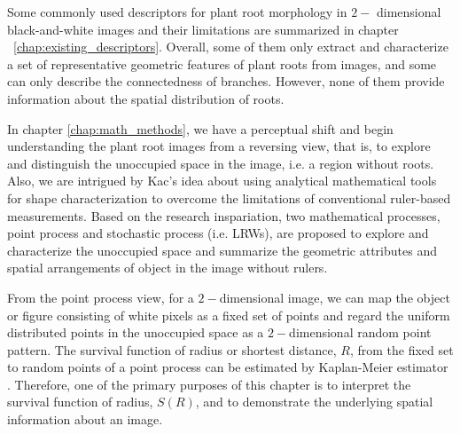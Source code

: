 


Some commonly used descriptors for plant root morphology in $2-$
dimensional black-and-white images and their limitations are
summarized in chapter ~\ref{chap:existing_descriptors}. Overall, some
of them only extract and characterize a set of representative
geometric features of plant roots from images, and some can only
describe the connectedness of branches. However, none of them provide
information about the spatial distribution of roots.


In chapter \ref{chap:math_methods}, we have a perceptual shift and
begin understanding the plant root images from a reversing view, that
is, to explore and distinguish the unoccupied space in the image,
i.e. a region without roots. Also, we are intrigued by Kac's
idea \cite{kac1966can} about using analytical mathematical tools for
shape characterization to overcome the limitations of conventional
ruler-based measurements. Based on the research inspariation, two
mathematical processes, point process and stochastic process
(i.e. LRWs), are proposed to explore and characterize the unoccupied
space and summarize the geometric attributes and spatial arrangements
of object in the image without rulers.



From the point process \cite{zahle1982random} view, for a
$2-$dimensional image, we can map the object or figure consisting of
white pixels as a fixed set of points and regard the uniform
distributed points in the unoccupied space as a $2-$dimensional random
point pattern. The survival function of radius or shortest distance,
$R$, from the fixed set to random points of a point process can be
estimated by Kaplan-Meier
estimator \cite{kaplan1958nonparametric} \cite{aalen2008survival} \cite{cameron_davidson_pilon_2021_4505728}. Therefore,
one of the primary purposes of this chapter is to interpret the
survival function of radius, $S(R)$, and to demonstrate the underlying
spatial information about an image.



